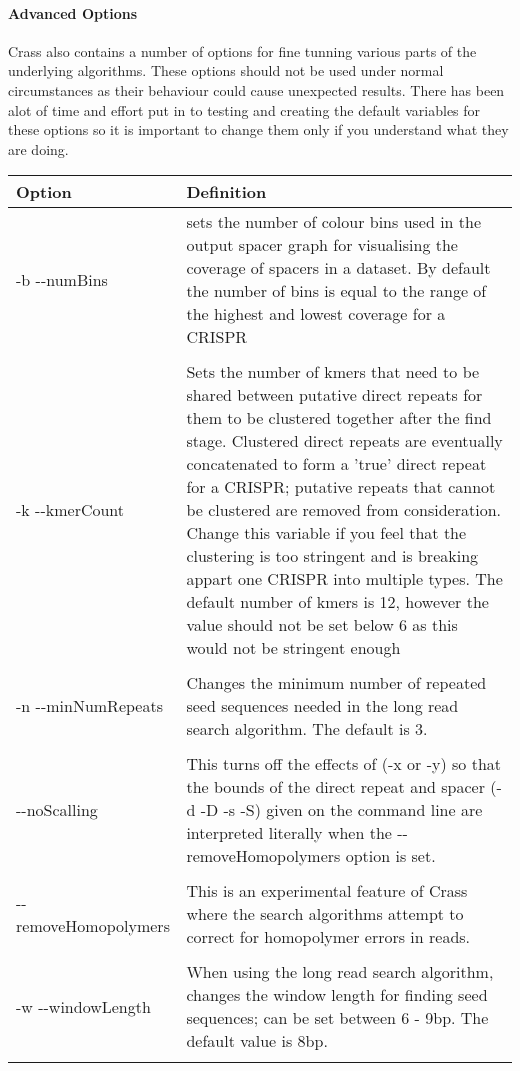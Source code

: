 \documentclass[11pt]{article} %
\begin{document}
\paragraph{Advanced Options}
Crass also contains a number of options for fine tunning various parts of the underlying algorithms.  These options should not be used under normal circumstances as their behaviour could cause unexpected results.  There has been alot of time and effort put in to testing and creating the default variables for these options so it is important to change them only if you understand what they are doing.
    \begin{longtable}{  l   p{10cm} }
    \hline
    Option & Definition \\  \hline\hline 
-b -{}-numBins &  sets the number of colour bins used in the output spacer graph for visualising the coverage of spacers in a dataset.  By default the number of bins is equal to the range of the highest and lowest coverage for a CRISPR \\ \\
-k -{}-kmerCount & Sets the number of kmers that need to be shared between putative direct repeats for them to be clustered together after the find stage.  Clustered direct repeats are eventually concatenated to form a 'true' direct repeat for a CRISPR; putative repeats that cannot be clustered are removed from consideration.  Change this variable if you feel that the clustering is too stringent and is breaking appart one CRISPR into multiple types.  The default number of kmers is 12, however the value should not be set below 6 as this would not be stringent enough\\ \\
-n -{}-minNumRepeats & Changes the minimum number of repeated seed sequences needed in the long read search algorithm. The default is 3.\\ \\
-{}-noScalling & This turns off the effects of (-x or -y) so that the bounds of the direct repeat and spacer (-d -D -s -S) given on the command line are interpreted literally when the -{}-removeHomopolymers option is set. \\ \\
-{}-removeHomopolymers & This is an experimental feature of Crass where the search algorithms attempt to correct for homopolymer errors in reads.\\ \\ 
-w -{}-windowLength & When using the long read search algorithm, changes the window length for finding seed sequences; can be set between 6 - 9bp.  The default value is 8bp.\\ \\ 

\end{longtable}
\end{document}
